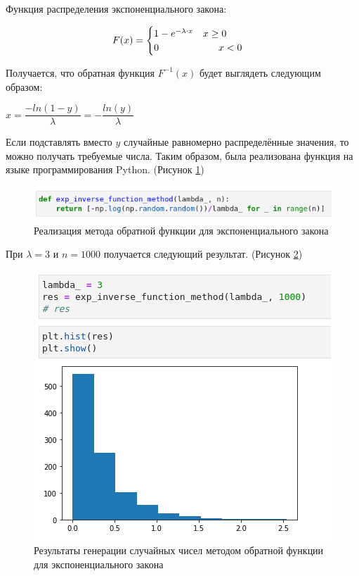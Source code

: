 \documentclass[14pt,fleqn]{extarticle}
\begin{document}
	Функция распределения экспоненциального закона:
	\begin{ceqn}
	\begin{align*}
		F(x) =
		\begin{cases}
			1 - e^{-\lambda \cdot x} \quad x \geq 0\\
			0 \hspace{2.15cm} x < 0
		\end{cases}
	\end{align*}
	\end{ceqn}

	Получается, что обратная функция $F^{-1}(x)$ будет выглядеть следующим образом:
	\begin{center}
		$x = \dfrac{-ln(1-y)}{\lambda} = -\dfrac{ln(y)}{\lambda}$
	\end{center}
	Если подставлять вместо $y$ случайные равномерно распределённые значения, то можно получать требуемые числа.
	\newpage
	Таким образом, была реализована функция на языке программирования Python. (Рисунок \ref{fig:exp_inverse_function_method_code})
	\begin{figure}[h]
		\centering \includegraphics[scale=0.8]{code3}
		\caption{Реализация метода обратной функции для экспоненциального закона}
		\label{fig:exp_inverse_function_method_code}
	\end{figure}

	При $\lambda = 3$ и $n = 1000$ получается следующий результат. (Рисунок \ref{fig:exp_inverse_function_method_result})
	\begin{figure}[h]
		\centering \includegraphics[scale=0.8]{result3}
		\caption{Результаты генерации случайных чисел методом обратной функции для экспоненциального закона}
		\label{fig:exp_inverse_function_method_result}
	\end{figure}
\end{document}
